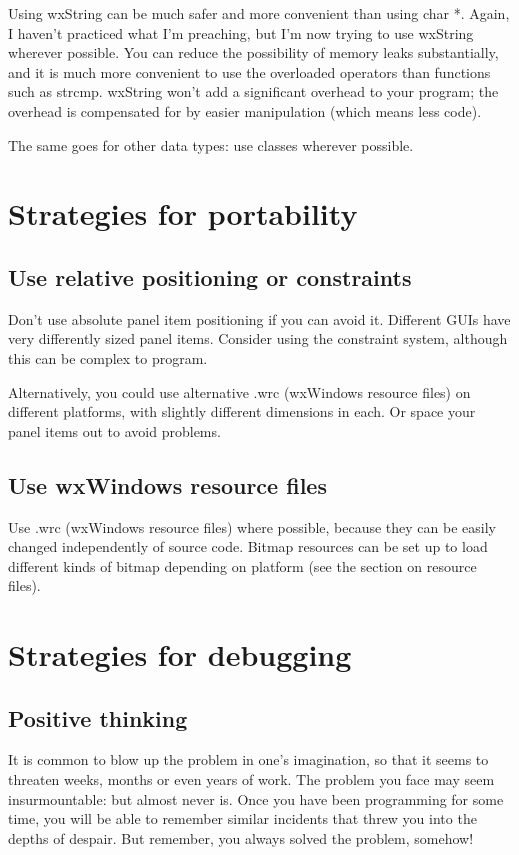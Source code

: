Using wxString can be much safer and more convenient than using char *.
Again, I haven't practiced what I'm preaching, but I'm now trying to use
wxString wherever possible. You can reduce the possibility of memory
leaks substantially, and it is much more convenient to use the overloaded
operators than functions such as strcmp. wxString won't add a significant
overhead to your program; the overhead is compensated for by easier
manipulation (which means less code).

The same goes for other data types: use classes wherever possible.

\section{Strategies for portability}

\subsection{Use relative positioning or constraints}

Don't use absolute panel item positioning if you can avoid it. Different GUIs have
very differently sized panel items. Consider using the constraint system, although this
can be complex to program.

Alternatively, you could use alternative .wrc (wxWindows resource files) on different
platforms, with slightly different dimensions in each. Or space your panel items out
to avoid problems.

\subsection{Use wxWindows resource files}

Use .wrc (wxWindows resource files) where possible, because they can be easily changed
independently of source code. Bitmap resources can be set up to load different
kinds of bitmap depending on platform (see the section on resource files).

\section{Strategies for debugging}\label{debugstrategies}

\subsection{Positive thinking}

It is common to blow up the problem in one's imagination, so that it seems to threaten
weeks, months or even years of work. The problem you face may seem insurmountable:
but almost never is. Once you have been programming for some time, you will be able
to remember similar incidents that threw you into the depths of despair. But
remember, you always solved the problem, somehow!

